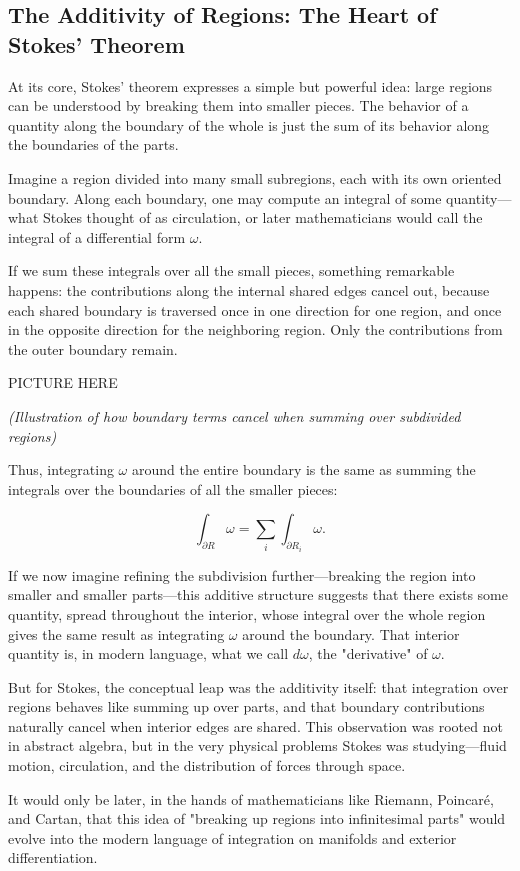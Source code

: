 \subsection{The Additivity of Regions: The Heart of Stokes' Theorem}

At its core, Stokes' theorem expresses a simple but powerful idea: large regions can be understood by breaking them into smaller pieces. The behavior of a quantity along the boundary of the whole is just the sum of its behavior along the boundaries of the parts.

Imagine a region divided into many small subregions, each with its own oriented boundary. Along each boundary, one may compute an integral of some quantity—what Stokes thought of as circulation, or later mathematicians would call the integral of a differential form \(\omega\).

If we sum these integrals over all the small pieces, something remarkable happens: the contributions along the internal shared edges cancel out, because each shared boundary is traversed once in one direction for one region, and once in the opposite direction for the neighboring region. Only the contributions from the outer boundary remain.

\begin{center}
PICTURE HERE
\end{center}

\textit{(Illustration of how boundary terms cancel when summing over subdivided regions)}

Thus, integrating \(\omega\) around the entire boundary is the same as summing the integrals over the boundaries of all the smaller pieces:

\[
\int_{\partial R} \omega = \sum_{i} \int_{\partial R_i} \omega.
\]

If we now imagine refining the subdivision further—breaking the region into smaller and smaller parts—this additive structure suggests that there exists some quantity, spread throughout the interior, whose integral over the whole region gives the same result as integrating \(\omega\) around the boundary. That interior quantity is, in modern language, what we call \(d\omega\), the "derivative" of \(\omega\).

But for Stokes, the conceptual leap was the additivity itself: that integration over regions behaves like summing up over parts, and that boundary contributions naturally cancel when interior edges are shared. This observation was rooted not in abstract algebra, but in the very physical problems Stokes was studying—fluid motion, circulation, and the distribution of forces through space.

It would only be later, in the hands of mathematicians like Riemann, Poincaré, and Cartan, that this idea of "breaking up regions into infinitesimal parts" would evolve into the modern language of integration on manifolds and exterior differentiation.
